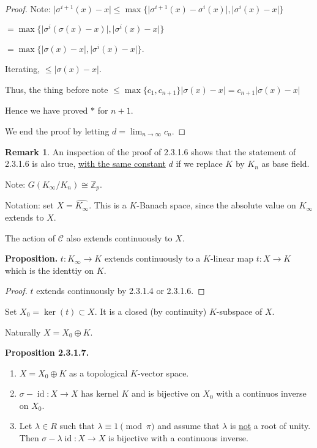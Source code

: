 \documentclass{article}
\theoremstyle{definition}
\numberwithin{theorem}{subsection}
\newtheorem*{remark}{Remark}
\begin{document}
\begin{proof}
        Note: \(\vert \sigma^{i+1}(x) - x \vert \leq \max \{ \vert \sigma^{i+1} (x) - \sigma^i(x) \vert, \vert \sigma^i(x) - x \vert \}\)

        \(= \max \{ \vert \sigma^i(\sigma (x) - x) \vert, \vert \sigma^i(x) - x \vert\}\)
        
        \(= \max \{ \vert \sigma(x) - x \vert, \vert \sigma^i(x) - x \vert \}\).


        Iterating, \(\leq \vert \sigma (x) - x \vert\).

        Thus, the thing before note \(\leq \max \{ c_1, c_{n+1} \} \vert \sigma(x) - x \vert = c_{n+1} \vert \sigma(x) - x \vert\)
        
        Hence we have proved \(\ast\) for \(n+1\).

        We end the proof by letting \(d = \lim_{n \to \infty} c_n\).

    \end{proof}

    \begin{remark}
        An inspection of the proof of 2.3.1.6 shows that the statement of 2.3.1.6 is also true, \underline{with the same constant} \(d\) if we replace \(K\) by \(K_n\) as base field.

        Note: \(G(K_\infty / K_n) \cong \mathbb{Z}_p\).
    \end{remark}

    Notation: set \(X = \widehat{K_\infty}\). This is a \(K\)-Banach space, since the absolute value on \(K_\infty\) extends to \(X\).

    The action of \(\mathscr{C}\) also extends continuously to \(X\).

    \textbf{Proposition.} \(t: K_\infty \to K\) extends continuously to a \(K\)-linear map \(t: X \to K\) which is the identtiy on \(K\).

    \begin{proof}
        \(t\) extends continuously by 2.3.1.4 or 2.3.1.6.
    \end{proof}

    Set \(X_0 = \ker (t) \subset X\). It is a closed (by continuity) \(K\)-subspace of \(X\).

    Naturally \(X = X_0 \oplus K\).

    \textbf{Proposition 2.3.1.7.}

    \begin{enumerate}[label=\alph*)]
        \item \(X = X_0 \oplus K\) as a topological \(K\)-vector space.
        \item \(\sigma - \operatorname{id}: X \to X\) has kernel \(K\) and is bijective on \(X_0\) with a continuos inverse on \(X_0\).
        \item Let \(\lambda \in R\) such that \(\lambda \equiv 1 \pmod\pi\) and assume that \(\lambda\) is \underline{not} a root of unity. Then \(\sigma - \lambda \operatorname{id} : X \to X\) is bijective with a continuous inverse.
    \end{enumerate} 
\end{document}
